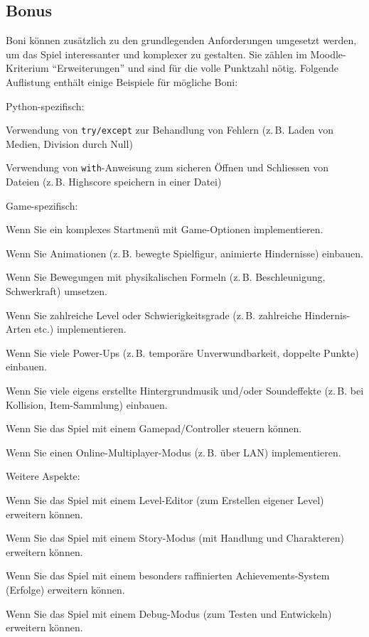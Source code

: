 \subsection{Bonus}
Boni können zusätzlich zu den grundlegenden Anforderungen umgesetzt werden, um das Spiel interessanter und komplexer zu gestalten. Sie zählen im Moodle-Kriterium \enquote{Erweiterungen} und sind für die volle Punktzahl nötig. Folgende Auflistung enthält einige Beispiele für mögliche Boni:
\begin{todolist}
    \item Python-spezifisch:
    \begin{todolist}
        \item Verwendung von \texttt{try/except} zur Behandlung von Fehlern (z.\,B. Laden von Medien, Division durch Null)
        \item Verwendung von \texttt{with}-Anweisung zum sicheren Öffnen und Schliessen von Dateien (z.\,B. Highscore speichern in einer Datei)
    \end{todolist}
    \item Game-spezifisch:
    \begin{todolist}
        \item Wenn Sie ein komplexes Startmenü mit Game-Optionen implementieren.
        \item Wenn Sie Animationen (z.\,B. bewegte Spielfigur, animierte Hindernisse) einbauen.
        \item Wenn Sie Bewegungen mit physikalischen Formeln (z.\,B. Beschleunigung, Schwerkraft) umsetzen.
        \item Wenn Sie zahlreiche Level oder Schwierigkeitsgrade (z.\,B. zahlreiche Hindernis-Arten etc.) implementieren.
        \item Wenn Sie viele Power-Ups (z.\,B. temporäre Unverwundbarkeit, doppelte Punkte) einbauen.
        \item Wenn Sie viele eigens erstellte Hintergrundmusik und/oder Soundeffekte (z.\,B. bei Kollision, Item-Sammlung) einbauen.
        \item Wenn Sie das Spiel mit einem Gamepad/Controller steuern können.
        \item Wenn Sie einen Online-Multiplayer-Modus (z.\,B. über LAN) implementieren.
    \end{todolist}
    \item Weitere Aspekte:
    \begin{todolist}
        \item Wenn Sie das Spiel mit einem Level-Editor (zum Erstellen eigener Level) erweitern können.
        \item Wenn Sie das Spiel mit einem Story-Modus (mit Handlung und Charakteren) erweitern können.
        \item Wenn Sie das Spiel mit einem besonders raffinierten Achievements-System (Erfolge) erweitern können.
        \item Wenn Sie das Spiel mit einem Debug-Modus (zum Testen und Entwickeln) erweitern können.
    \end{todolist}
\end{todolist}

